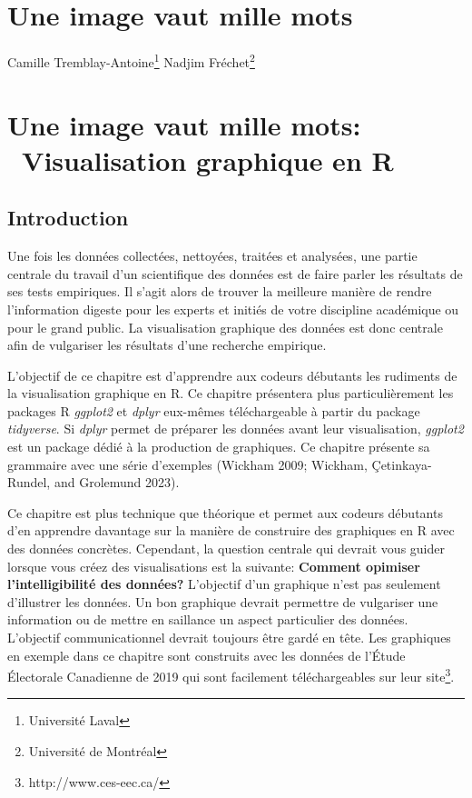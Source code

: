 \documentclass[
  letterpaper,
  DIV=11,
  numbers=noendperiod]{scrreprt}
\begin{document}

\hypertarget{une-image-vaut-mille-mots}{%
\chapter{Une image vaut mille mots}\label{une-image-vaut-mille-mots}}

Camille Tremblay-Antoine\footnote{Université Laval} Nadjim
Fréchet\footnote{Université de Montréal}


\hypertarget{visualisation-graphique-en-r}{%
\chapter{\texorpdfstring{\textbf{Une image vaut mille mots:}
~Visualisation graphique en
R}{ ~Visualisation graphique en R}}\label{visualisation-graphique-en-r}}

\hypertarget{introduction}{%
\section{Introduction}\label{introduction}}

Une fois les données collectées, nettoyées, traitées et analysées, une
partie centrale du travail d'un scientifique des données est de faire
parler les résultats de ses tests empiriques. Il s'agit alors de trouver
la meilleure manière de rendre l'information digeste pour les experts et
initiés de votre discipline académique ou pour le grand public. La
visualisation graphique des données est donc centrale afin de vulgariser
les résultats d'une recherche empirique.

L'objectif de ce chapitre est d'apprendre aux codeurs débutants les
rudiments de la visualisation graphique en R. Ce chapitre présentera
plus particulièrement les packages R \emph{ggplot2} et \emph{dplyr}
eux-mêmes téléchargeable à partir du package \emph{tidyverse}. Si
\emph{dplyr} permet de préparer les données avant leur visualisation,
\emph{ggplot2} est un package dédié à la production de graphiques. Ce
chapitre présente sa grammaire avec une série d'exemples (Wickham 2009;
Wickham, Çetinkaya-Rundel, and Grolemund 2023).

Ce chapitre est plus technique que théorique et permet aux codeurs
débutants d'en apprendre davantage sur la manière de construire des
graphiques en R avec des données concrètes. Cependant, la question
centrale qui devrait vous guider lorsque vous créez des visualisations
est la suivante: \textbf{Comment opimiser l'intelligibilité des
données?} L'objectif d'un graphique n'est pas seulement d'illustrer les
données. Un bon graphique devrait permettre de vulgariser une
information ou de mettre en saillance un aspect particulier des données.
L'objectif communicationnel devrait toujours être gardé en tête. Les
graphiques en exemple dans ce chapitre sont construits avec les données
de l'Étude Électorale Canadienne de 2019 qui sont facilement
téléchargeables sur leur site\footnote{http://www.ces-eec.ca/}.
\end{document}
